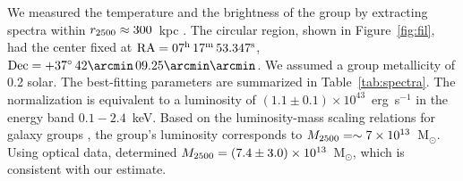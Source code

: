 We measured the temperature and the brightness of the group by extracting spectra within $r_{\rm 2500} \approx 300$~kpc \citep{Medezinski2013}. The circular region, shown in Figure~\ref{fig:fil}, had the center fixed at ${\rm RA} = 07^{\rm h}\, 17^{\rm m}\, 53.347^{\rm s}$, ${\rm Dec} = +37^{\circ}\, 42\arcmin \, 09.25\arcmin\arcmin$. We assumed a group metallicity of 0.2 solar. The best-fitting parameters are summarized in Table~\ref{tab:spectra}. The normalization is equivalent to a luminosity of $(1.1\pm 0.1) \times 10^{43}$~erg~s$^{-1}$ in the energy band $0.1-2.4$~keV. Based on the luminosity-mass scaling relations for galaxy groups \citep[e.g.,][]{Connor2014}, the group's luminosity corresponds to $M_{\rm 2500} = \sim 7\times 10^{13}$~M$_\odot$. Using optical data, \citet{Medezinski2013} determined $M_{\rm 2500} = (7.4\pm 3.0) \times 10^{13}$~M$_\odot$, which is consistent with our estimate.
